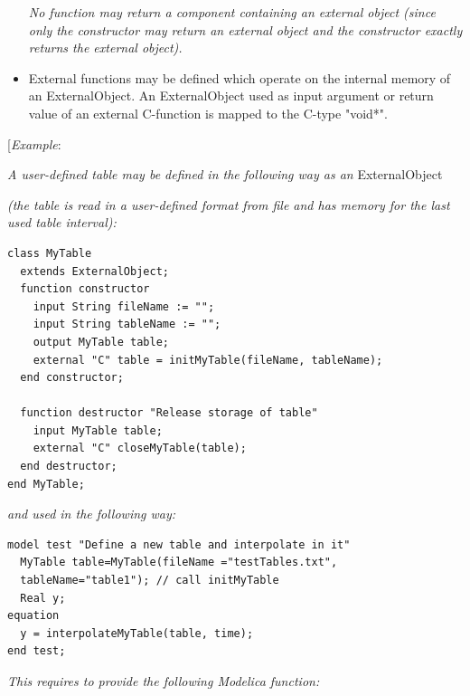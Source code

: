 \documentclass[10pt,a4paper]{report}
\begin{document}
\begin{itemize}
  \emph{No function may return a component containing an external object
  (since only the constructor may return an external object and the
  constructor exactly returns the external object).}
\item
  External functions may be defined which operate on the internal memory
  of an ExternalObject. An ExternalObject used as input argument or
  return value of an external C-function is mapped to the C-type
  "void*".
\end{itemize}

{[}\emph{Example}:

\emph{A user-defined table may be defined in the following way as an}
ExternalObject

\emph{(the table is read in a user-defined format from file and has
memory for the last used table interval):}

\begin{lstlisting}[language=modelica]
class MyTable
  extends ExternalObject;
  function constructor
    input String fileName := "";
    input String tableName := "";
    output MyTable table;
    external "C" table = initMyTable(fileName, tableName);
  end constructor;

  function destructor "Release storage of table"
    input MyTable table;
    external "C" closeMyTable(table);
  end destructor;
end MyTable;
\end{lstlisting}
\emph{and used in the following way:}

\begin{lstlisting}[language=modelica]
model test "Define a new table and interpolate in it"
  MyTable table=MyTable(fileName ="testTables.txt",
  tableName="table1"); // call initMyTable
  Real y;
equation
  y = interpolateMyTable(table, time);
end test;
\end{lstlisting}
\emph{This requires to provide the following Modelica function:}
\end{document}
